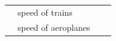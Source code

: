 {\begin{center}
\begin{xtabular*}{\mytablewidth}[t]{|p{10\mystarwidth}|p{10\mystarwidth}|p{10\mystarwidth}|p{10\mystarwidth}|}
    
         &
    
    
        speed of trains &
    
    
         &
    
    
     \tabularnewline{}
    
    
         &
    
    
        speed of aeroplanes &
    
    
         &
    
    
     \tabularnewline{}
    

\end{xtabular*}
\end{center}}
